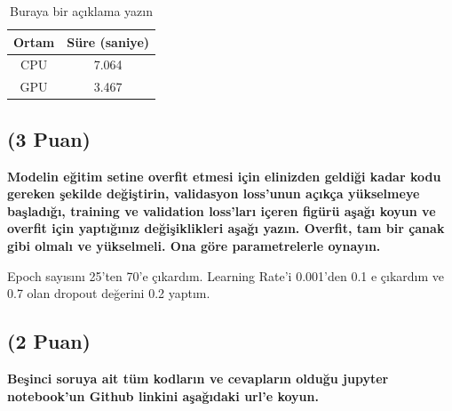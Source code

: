 \documentclass[11pt]{article}
\begin{document}
\begin{table}[ht!]
    \centering
    \caption{Buraya bir açıklama yazın}
    \begin{tabular}{c|c}
        Ortam & Süre (saniye) \\\hline
        CPU & 7.064 \\
        GPU & 3.467\\
    \end{tabular}
    \label{tab:my_table}
\end{table}

\subsection{(3 Puan)} \textbf{Modelin eğitim setine overfit etmesi için elinizden geldiği kadar kodu gereken şekilde değiştirin, validasyon loss'unun açıkça yükselmeye başladığı, training ve validation loss'ları içeren figürü aşağı koyun ve overfit için yaptığınız değişiklikleri aşağı yazın. Overfit, tam bir çanak gibi olmalı ve yükselmeli. Ona göre parametrelerle oynayın.}

Epoch sayısını 25'ten 70'e çıkardım. Learning Rate'i 0.001'den 0.1 e çıkardım ve 0.7 olan dropout değerini 0.2 yaptım.

\subsection{(2 Puan)} \textbf{Beşinci soruya ait tüm kodların ve cevapların olduğu jupyter notebook'un Github linkini aşağıdaki url'e koyun.}
\end{document}
